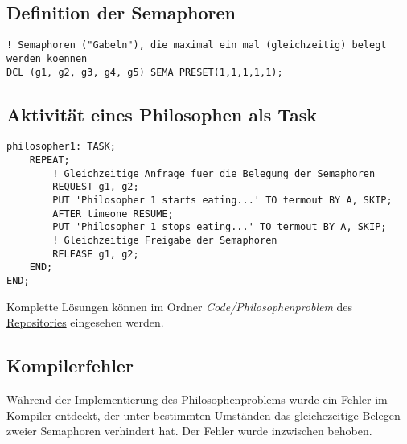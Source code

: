 \subsection{Definition der Semaphoren}
	\begin{lstlisting}
! Semaphoren ("Gabeln"), die maximal ein mal (gleichzeitig) belegt werden koennen
DCL (g1, g2, g3, g4, g5) SEMA PRESET(1,1,1,1,1);
	\end{lstlisting}
	
\subsection{Aktivität eines Philosophen als Task}
	\begin{lstlisting}
philosopher1: TASK;
	REPEAT;
		! Gleichzeitige Anfrage fuer die Belegung der Semaphoren
		REQUEST g1, g2;
		PUT 'Philosopher 1 starts eating...' TO termout BY A, SKIP;
		AFTER timeone RESUME;
		PUT 'Philosopher 1 stops eating...' TO termout BY A, SKIP;
		! Gleichzeitige Freigabe der Semaphoren
		RELEASE g1, g2;
	END;
END;
	\end{lstlisting}
	
	Komplette Lösungen können im Ordner \emph{Code/Philosophenproblem} des \href{https://github.com/OpenPearl-HFUWPV1718/SensorCar}{Repositories} eingesehen werden.\\

\subsection{Kompilerfehler}
	Während der Implementierung des Philosophenproblems wurde ein Fehler im Kompiler entdeckt, der unter bestimmten Umständen das gleichezeitige Belegen zweier Semaphoren verhindert hat. Der Fehler wurde inzwischen behoben.